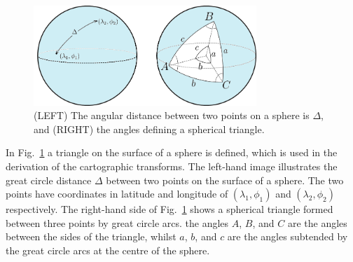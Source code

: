 \begin{figure}
    \begin{center}
        \includegraphics[width=0.75\textwidth]{Figures/geometry_appendix/spherical_geometry}
        \caption[Spherical trigonometry]{(LEFT) The angular distance between two points on a sphere is $\Delta$, and (RIGHT) the angles defining a spherical triangle.}
        \label{fig: geometry derivations - spherical trigonometry}
    \end{center}
\end{figure}
In Fig.~\ref{fig: geometry derivations - spherical trigonometry} a triangle on the surface of a sphere is defined, which is used in the derivation of the cartographic transforms. The left-hand image illustrates the great circle distance $\Delta$ between two points on the surface of a sphere. The two points have coordinates in latitude and longitude of $(\lambda_1, \phi_1)$ and $(\lambda_2, \phi_2)$ respectively. The right-hand side of Fig.~\ref{fig: geometry derivations - spherical trigonometry} shows a spherical triangle formed between three points by great circle arcs. the angles $A$, $B$, and $C$ are the angles between the sides of the triangle, whilst $a$, $b$, and $c$ are the angles subtended by the great circle arcs at the centre of the sphere.

